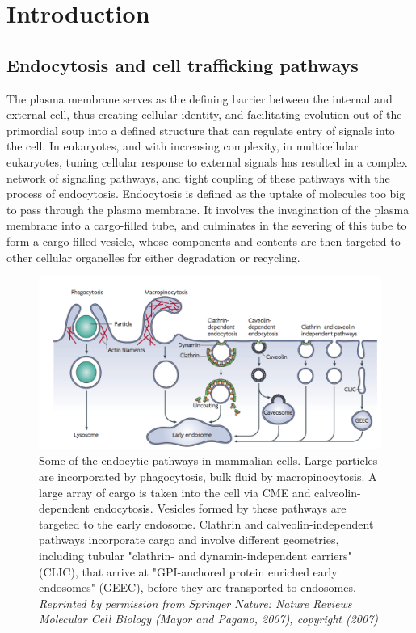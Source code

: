 \chapter{Introduction} %
\graphicspath{ {/Users/kaksonenlab/Desktop/figures/} }
\label{Ch:Intro} %

\section{Endocytosis and cell trafficking pathways}
The plasma membrane serves as the defining barrier between the internal and external cell, thus creating cellular identity, and facilitating evolution out of the primordial soup into a defined structure that can regulate entry of signals into the cell. In eukaryotes, and with increasing complexity, in multicellular eukaryotes, tuning cellular response to external signals has resulted in a complex network of signaling pathways, and tight coupling of these pathways with the process of endocytosis. Endocytosis is defined as the uptake of molecules too big to pass through the plasma membrane. It involves the invagination of the plasma membrane into a cargo-filled tube, and culminates in the severing of this tube to form a cargo-filled vesicle, whose components and contents are then targeted to other cellular organelles for either degradation or recycling. 

\begin{figure}[H]
	\centering
	\includegraphics[scale=0.3]{figures/intro/Fig1_mayor}
	\caption[Endocytic pathways in cells]
	{Some of the endocytic pathways in mammalian cells. Large particles are incorporated by phagocytosis, bulk fluid by macropinocytosis. A large array of cargo is taken into the cell via CME and calveolin-dependent endocytosis. Vesicles formed by these pathways are targeted to the early endosome. Clathrin and calveolin-independent pathways incorporate cargo and involve different geometries, including tubular "clathrin- and dynamin-independent carriers" (CLIC), that arrive at "GPI-anchored protein enriched early endosomes" (GEEC), before they are transported to endosomes.  \textit{Reprinted by permission from Springer Nature: Nature Reviews Molecular Cell Biology (Mayor and Pagano, 2007), copyright (2007)}}
\end{figure}


